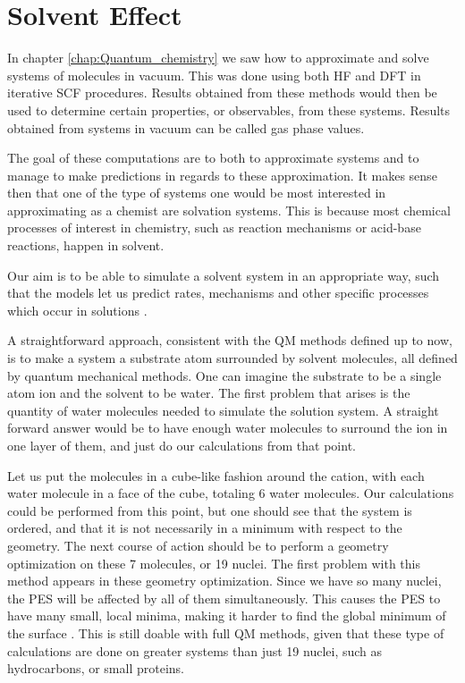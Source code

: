 \documentclass[../master_thesis.tex]{subfiles}
\begin{document}
\chapter{Solvent Effect}\label{chap:Solvent_effect}
In chapter \ref{chap:Quantum_chemistry} we saw how to approximate and
solve systems of molecules in vacuum. This was done using both \ac{HF} and \ac{DFT}
in iterative \ac{SCF} procedures. Results obtained from these methods would then
be used to determine certain properties, or observables, from these systems. Results
obtained from systems in vacuum can be called gas phase values.

The goal of these computations are to both to approximate systems and to manage to
make predictions in regards to these approximation. It makes sense then that one
of  the type of systems one would be most interested in approximating as a chemist
are solvation systems. This is because most chemical processes of interest in
chemistry, such as reaction mechanisms or acid-base reactions, happen in
solvent.

Our aim is to be able to simulate a solvent system in an appropriate way, such that
the models let us predict rates, mechanisms and other specific processes which
occur in solutions \cite{Tomasi:1994wt}.

A straightforward approach, consistent with the \ac{QM} methods defined up to now,
is to make a system a substrate atom surrounded by solvent molecules, all defined
by quantum mechanical methods. One can imagine the substrate to be a single atom
ion and the solvent to be water.  The first problem that arises is the quantity of
water molecules needed to simulate the solution system. A straight forward answer would
be to have enough water molecules to surround  the ion in one layer of them,
and just do our calculations from that point.

Let us put the molecules in a cube-like fashion around the cation, with each
water molecule in a face of the cube, totaling 6 water molecules. Our calculations
could be performed from this point, but one should see that the system is ordered,
and that it is not necessarily in a minimum with respect to the geometry. The
next course of action should be to perform a geometry optimization on these 7
molecules, or 19 nuclei. The first problem with this method appears in these
geometry optimization. Since we have so many nuclei, the \ac{PES} will be affected
by all of them simultaneously. This causes the \ac{PES} to have many small, local
minima, making it harder to find the global minimum of the surface \cite{Cramer:2004}. This is still
doable with full \ac{QM} methods, given that these type of calculations are done
on greater systems than just 19 nuclei, such as hydrocarbons, or small proteins.
\end{document}

